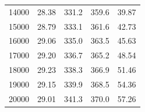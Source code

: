 \documentclass[12pt]{extarticle}
\begin{document}
\begin{table}[H]
\begin{tabular}{|c|c|c|c|c|}
    		14000 & 28.38                      & 331.2                       & 359.6                                        & 39.87                               \\
    		15000 & 28.79                      & 333.1                       & 361.6                                        & 42.73                               \\
    		16000 & 29.06                      & 335.0                       & 363.5                                        & 45.63                               \\
    		17000 & 29.20                      & 336.7                       & 365.2                                        & 48.54                               \\
    		18000 & 29.23                      & 338.3                       & 366.9                                        & 51.46                               \\
    		19000 & 29.15                      & 339.9                       & 368.5                                        & 54.36                               \\
    		20000 & 29.01                      & 341.3                       & 370.0                                        & 57.26                              \\ \hline
    	\end{tabular}
    \end{table}
    
\end{document}
